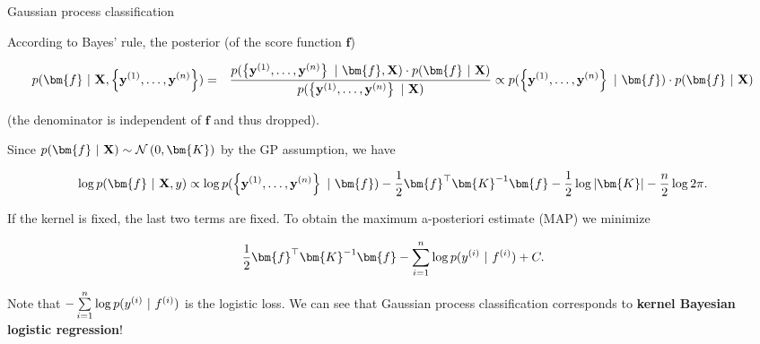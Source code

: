 \begin{vbframe}{Gaussian process classification}







According to Bayes' rule, the posterior (of the score function $\bm{f}$)

\vspace*{-0.5cm}

\begin{eqnarray*}
  p(\bm{f} ~|~ \Xmat, \ydat) &=&  \frac{p(\ydat ~|~ \bm{f}, \Xmat) \cdot p(\bm{f} ~|~ \Xmat)}{p(\ydat ~|~\Xmat)} \propto p(\ydat ~|~ \bm{f}) \cdot p(\bm{f} ~|~ \Xmat)
\end{eqnarray*}

(the denominator is independent of $\bm{f}$ and thus dropped).

\lz 

Since $p(\bm{f} ~|~ \Xmat) \sim \mathcal{N}\left(0, \bm{K}\right)$ by the GP assumption, we have

\vspace*{-0.2cm}

$$
  \log p(\bm{f} ~|~ \Xmat, y) \propto \log p(\ydat ~|~ \bm{f}) - \frac{1}{2} \bm{f}^\top \bm{K}^{-1} \bm{f} - \frac{1}{2} \log |\bm{K}| - \frac{n}{2} \log 2 \pi. 
$$

\framebreak  

If the kernel is fixed, the last two terms are fixed. To obtain the maximum a-posteriori estimate (MAP) we minimize

$$
  \frac{1}{2} \bm{f}^\top \bm{K}^{-1} \bm{f} - \sumin \log p(\yi ~|~ f^{(i)}) + C.
$$

Note that $- \sum\limits_{i=1}^n \log p(y^{(i)} ~|~ f^{(i)})$
is the logistic loss. We can see that Gaussian process classification corresponds to \textbf{kernel Bayesian logistic regression}! 

\end{vbframe}

